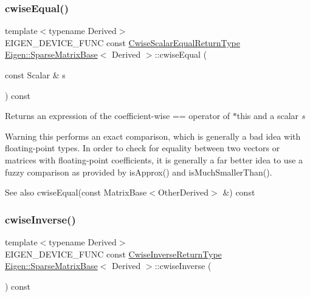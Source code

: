 \subsubsection{\texorpdfstring{cwiseEqual()}{cwiseEqual()}\hspace{0.1cm}{\footnotesize\ttfamily [2/2]}}
{\footnotesize\ttfamily template$<$typename Derived$>$ \\
E\+I\+G\+E\+N\+\_\+\+D\+E\+V\+I\+C\+E\+\_\+\+F\+U\+NC const \mbox{\hyperlink{class_eigen_1_1_cwise_binary_op}{Cwise\+Scalar\+Equal\+Return\+Type}} \mbox{\hyperlink{class_eigen_1_1_sparse_matrix_base}{Eigen\+::\+Sparse\+Matrix\+Base}}$<$ Derived $>$\+::cwise\+Equal (\begin{DoxyParamCaption}\item[{const Scalar \&}]{s }\end{DoxyParamCaption}) const\hspace{0.3cm}{\ttfamily [inline]}}

\begin{DoxyReturn}{Returns}
an expression of the coefficient-\/wise == operator of {\ttfamily $\ast$this} and a scalar {\itshape s} 
\end{DoxyReturn}
\begin{DoxyWarning}{Warning}
this performs an exact comparison, which is generally a bad idea with floating-\/point types. In order to check for equality between two vectors or matrices with floating-\/point coefficients, it is generally a far better idea to use a fuzzy comparison as provided by is\+Approx() and is\+Much\+Smaller\+Than().
\end{DoxyWarning}
\begin{DoxySeeAlso}{See also}
cwise\+Equal(const Matrix\+Base$<$\+Other\+Derived$>$ \&) const 
\end{DoxySeeAlso}
\mbox{\label{class_eigen_1_1_sparse_matrix_base_a95fe63ce71f4dac974b9f36fd2e6e8fd}} 
\subsubsection{\texorpdfstring{cwiseInverse()}{cwiseInverse()}}
{\footnotesize\ttfamily template$<$typename Derived$>$ \\
E\+I\+G\+E\+N\+\_\+\+D\+E\+V\+I\+C\+E\+\_\+\+F\+U\+NC const \mbox{\hyperlink{class_eigen_1_1_cwise_unary_op}{Cwise\+Inverse\+Return\+Type}} \mbox{\hyperlink{class_eigen_1_1_sparse_matrix_base}{Eigen\+::\+Sparse\+Matrix\+Base}}$<$ Derived $>$\+::cwise\+Inverse (\begin{DoxyParamCaption}{ }\end{DoxyParamCaption}) const\hspace{0.3cm}{\ttfamily [inline]}}

